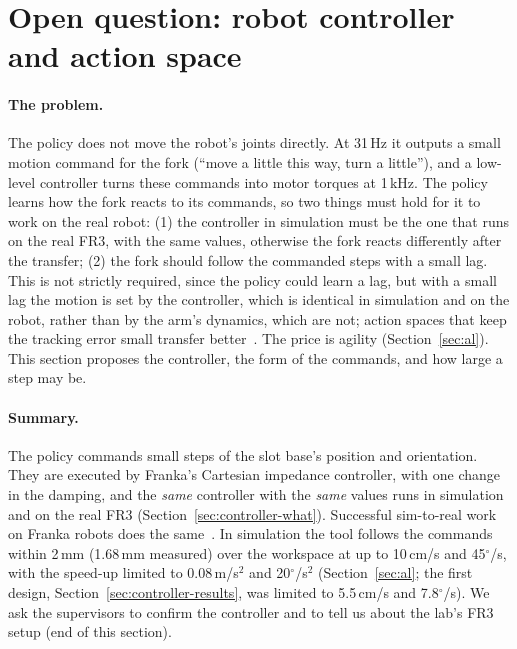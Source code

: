 
\section{Open question: robot controller and action space}
\label{sec:action-controller}

\paragraph{The problem.} The policy does not move the robot's joints directly. At 31\,Hz it outputs a small motion
command for the fork (``move a little this way, turn a little''), and a low-level controller turns these commands
into motor torques at 1\,kHz. The policy learns how the fork reacts to its commands, so two things must hold for it
to work on the real robot: (1) the controller in simulation must be the one that runs on the real FR3, with the same
values, otherwise the fork reacts differently after the transfer; (2) the fork should follow the commanded steps with
a small lag. This is not strictly required, since the policy could learn a lag, but with a small lag the motion is
set by the controller, which is identical in simulation and on the robot, rather than by the arm's dynamics, which
are not; action spaces that keep the tracking error small transfer better~\cite{aljalbout2024action}. The price is
agility (Section~\ref{sec:al}). This section proposes the controller, the form of the commands, and how large a step
may be.

\paragraph{Summary.} The policy commands small steps of the slot base's position and orientation. They are executed by
Franka's Cartesian impedance controller, with one change in the damping, and the \emph{same} controller with the
\emph{same} values runs in simulation and on the real FR3 (Section~\ref{sec:controller-what}). Successful sim-to-real
work on Franka robots does the same~\cite{tang2023industreal,frankatwin}. In simulation the tool follows the
commands within 2\,mm (1.68\,mm measured) over the workspace at up to 10\,cm/s and 45$^\circ$/s, with the speed-up
limited to 0.08\,m/s$^2$ and 20$^\circ$/s$^2$ (Section~\ref{sec:al}; the first design, Section~\ref{sec:controller-results},
was limited to 5.5\,cm/s and 7.8$^\circ$/s). We ask the supervisors to
confirm the controller and to tell us about the lab's FR3 setup (end of this section).

